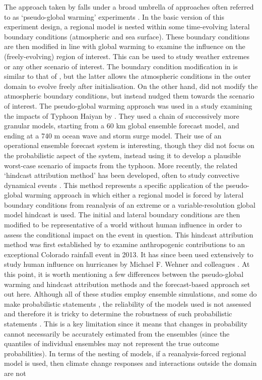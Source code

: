     The approach taken by \citeauthor{meredith_crucial_2015} falls under a broad umbrella of approaches often referred to as `pseudo-global warming' experiments \citep{schar_surrogate_1996}. In the basic version of this experiment design, a regional model is nested within some time-evolving lateral boundary conditions (atmospheric and sea surface). These boundary conditions are then modified in line with global warming to examine the influence on the (freely-evolving) region of interest. This can be used to study weather extremes or any other scenario of interest. The boundary condition modification in \citeauthor{schar_surrogate_1996} is similar to that of \citeauthor[]{lackmann_hurricane_2015}, but the latter allows the atmospheric conditions in the outer domain to evolve freely after initialisation. On the other hand, \citeauthor[]{meredith_crucial_2015} did not modify the atmospheric boundary conditions, but instead nudged them towards the scenario of interest. The pseudo-global warming approach was used in a study examining the impacts of Typhoon Haiyan by \citet{takayabu_climate_2015}. They used a chain of successively more granular models, starting from a 60 km global ensemble forecast model, and ending at a 740 m ocean wave and storm surge model. Their use of an operational ensemble forecast system is interesting, though they did not focus on the probabilistic aspect of the system, instead using it to develop a plausible worst-case scenario of impacts from the typhoon. More recently, the related `hindcast attribution method' has been developed, often to study convective dynamical events \citep{wehner_estimating_2019}. This method represents a specific application of the pseudo-global warming approach in which either a regional model is forced by lateral boundary conditions from reanalysis of an extreme or a variable-resolution global model hindcast is used. The initial and lateral boundary conditions are then modified to be representative of a world without human influence in order to assess the conditional impact on the event in question. This hindcast attribution method was first established by \citet{pall_diagnosing_2017} to examine anthropogenic contributions to an exceptional Colorado rainfall event in 2013. It has since been used extensively to study human influence on hurricanes by Michael F. Wehner and colleagues \citep{patricola_anthropogenic_2018,reed_forecasted_2020,reed_attribution_2022}. At this point, it is worth mentioning a few differences between the pseudo-global warming and hindcast attribution methods and the forecast-based approach set out here. Although all of these studies employ ensemble simulations, and some do make probabilistic statements \citep{pall_diagnosing_2017}, the reliability of the models used is not assessed and therefore it is tricky to determine the robustness of such probabilistic statements \citep{bellprat_towards_2019,weisheimer_reliability_2014}. This is a key limitation since it means that changes in probability cannot necessarily be accurately estimated from the ensembles (since the quantiles of individual ensembles may not represent the true outcome probabilities). In terms of the nesting of models, if a reanalysis-forced regional model is used, then climate change responses and interactions outside the domain are not 